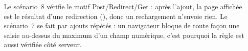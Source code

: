 Le scénario~8 vérifie le motif Post/Redirect/Get : après l'ajout, la page affichée est le résultat d'une redirection
(), donc un rechargement n'envoie rien. Le scénario~7 se fait par ajouts répétés : un navigateur bloque
de toute façon une saisie au-dessus du maximum d'un champ numérique, c'est pourquoi la règle est aussi vérifiée côté serveur.


